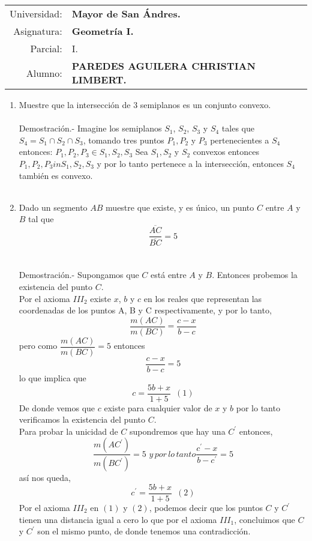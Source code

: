 \documentclass[10pt]{article}
\begin{document}
\begin{tabular}{r l }
Universidad: & \textbf{Mayor de San Ándres.}\\
Asignatura: & \textbf{Geometría I.}\\
 Parcial: & I.\\ 
Alumno: & \textbf{PAREDES AGUILERA CHRISTIAN LIMBERT.}
\end{tabular}
\begin{flushleft}
\end{flushleft}



    \begin{enumerate}

	\item Muestre que la intersección de $3$ semiplanos es un conjunto convexo.\\\\
	Demostración.-\; Imagine los semiplanos $S_1$, $S_2$,  $S_3$ y $S_4$ tales que $S_4 = S_1 \cap S_2 \cap S_3$, tomando tres puntos $P_1, P_2$ y $P_3$ pertenecientes a $S_4$ entonces: $P_1, P_2, P_3 \in S_1, S_2, S_3$ Sea $S_1,S_2$ y $S_2$ convexos entonces $P_1, P_2, P_3 in S_1, S_2, S_3$ y por lo tanto pertenece a la intersección, entonces $S_4$ también es convexo.\\\\

	\item Dado un segmento $AB$ muestre que existe, y es único, un punto $C$ entre $A$ y $B$ tal que $$\dfrac{\overline{AC}}{\overline{BC}}=5$$\\\\
	Demostración.-\; Supongamos que  $C$ está entre $A$ y $B$. Entonces probemos la existencia del punto $C$.\\
	Por el axioma $III_2$ existe $x$, $b$ y $c$ en los reales que representan las coordenadas de los puntos A, B y C respectivamente, y por lo tanto, $$\dfrac{m(AC)}{m(BC)}=\dfrac{c-x}{b-c}$$ pero como $\dfrac{m(AC)}{m(BC)}=5$ entonces $$\dfrac{c-x}{b-c}=5$$ lo que implica que $$c=\dfrac{5b+x}{1+5}\,\,\, (1)$$
	De donde vemos que $c$ existe para cualquier valor de $x$ y $b$ por lo tanto verificamos la existencia del punto $C$.\\
	Para probar la unicidad de $C$ supondremos que hay una $C^{'}$ entonces, $$\dfrac{m(AC^{'})}{m(BC^{'})}=5 \,\, y \, por \, lo \, tanto \dfrac{c^{'}-x}{b-c^{'}}=5$$ así nos queda, $$c^{'}=\dfrac{5b+x}{1+5}\,\,\, (2)$$ 
	Por el axioma $III_2$ en $(1)$ y $(2)$, podemos decir que los puntos $C$ y $C^{'}$ tienen una distancia igual a cero lo que por el axioma $III_1$, concluimos que $C$ y $C^{'}$ son el mismo punto, de donde tenemos una contradicción.\\\\ 


\end{enumerate}
\end{document}
